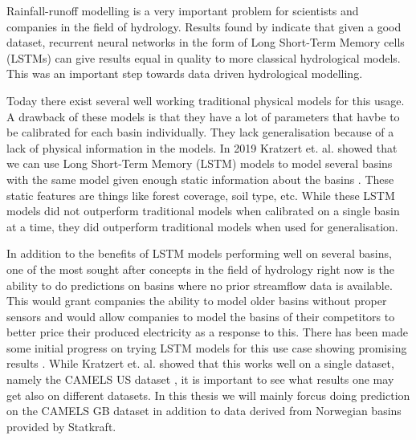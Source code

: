 Rainfall-runoff modelling is a very important problem for scientists and 
companies in the field of hydrology.
Results found by \cite{lstm_first_paper} indicate that given a good dataset,
recurrent neural networks in the form of Long Short-Term Memory cells (LSTMs)
can give results equal in quality to more classical hydrological models.
This was an important step towards data driven hydrological modelling. 

Today there exist several well working traditional physical models for this usage. \citationneeded
A drawback of these models is that they have a lot of parameters that havbe to be 
calibrated for each basin individually. They lack generalisation because of a lack of 
physical information in the models. \citationneeded In 2019 Kratzert et. al. showed
that we can use Long Short-Term Memory (LSTM) models to model several basins with the same model
given enough static information about the basins \cite{lstm_second_paper}. These 
static features are things like forest coverage, soil type, etc. While these LSTM 
models did not outperform traditional models when calibrated on a single basin at 
a time, they did outperform traditional models when used for generalisation.

In addition to the benefits of LSTM models performing well on several basins, 
one of the most sought after concepts in the field of hydrology right now is the 
ability to do predictions on basins where no prior streamflow data is available. \citationneeded
This would grant companies the ability to model older basins without proper sensors
and would allow companies to model the basins of their competitors to better price 
their produced electricity as a response to this. There has been made some initial 
progress on trying LSTM models for this use case showing promising results \cite{lstm_third_paper}.
While Kratzert et. al. showed that this works well on a single dataset, namely the 
CAMELS US dataset \cite{CAMELS_US}, it is important to see what results one may get 
also on different datasets. In this thesis we will mainly forcus doing prediction on 
the CAMELS GB dataset \cite{CAMELS_GB} in addition to data derived from Norwegian basins provided by 
Statkraft.

